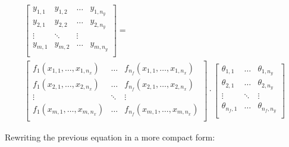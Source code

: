 \begin{multline*}
    \begin{bmatrix}
        y_{1,1} & y_{1,2} & \dots & y_{1,n_y} \\
        y_{2,1} & y_{2,2} & \dots & y_{2,n_y} \\
        \vdots & \ddots & \vdots \\
        y_{m,1} & y_{m,2} & \dots & y_{m,n_y} \\
    \end{bmatrix}
    =\\
        \begin{bmatrix}
            f_1(x_{1,1}, \dots, x_{1,n_x}) & \dots & f_{n_f}(x_{1,1}, \dots, x_{1,n_x}) \\
            f_1(x_{2,1}, \dots, x_{2,n_x}) & \dots & f_{n_f}(x_{2,1}, \dots, x_{2,n_x}) \\
            \vdots  & \ddots & \vdots \\
            f_1(x_{m,1}, \dots, x_{m,n_x}) & \dots & f_{n_f}(x_{m,1}, \dots, x_{m,n_x}) \\
        \end{bmatrix}
        \cdot
        \begin{bmatrix}
            \theta_{1,1}  & \dots & \theta_{1,n_y} \\
            \theta_{2,1}  & \dots & \theta_{2,n_y} \\
            \vdots & \ddots & \vdots \\
            \theta_{n_f,1}  & \dots & \theta_{n_f,n_y} \\
        \end{bmatrix}
\end{multline*}


Rewriting the previous equation in a more compact form:

